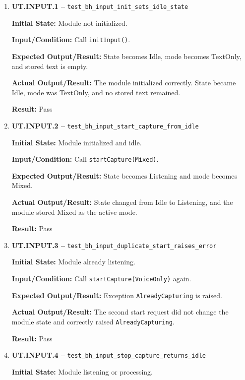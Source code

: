 \documentclass[12pt]{article}
\begin{document}
\begin{enumerate}
    \item \textbf{UT.INPUT.1 --}
    \texttt{test\_bh\_input\_init\_sets\_idle\_state}
    
    \textbf{Initial State:} Module not initialized.
    
    \textbf{Input/Condition:} Call \texttt{initInput()}.
    
    \textbf{Expected Output/Result:} State becomes Idle, mode becomes
    TextOnly, and stored text is empty.
    
    \textbf{Actual Output/Result:} The module initialized correctly.
    State became Idle, mode was TextOnly, and no stored text remained.
    
    \textbf{Result:} Pass
    
    \item \textbf{UT.INPUT.2 --}
    \texttt{test\_bh\_input\_start\_capture\_from\_idle}
    
    \textbf{Initial State:} Module initialized and idle.
    
    \textbf{Input/Condition:} Call \texttt{startCapture(Mixed)}.
    
    \textbf{Expected Output/Result:} State becomes Listening and mode
    becomes Mixed.
    
    \textbf{Actual Output/Result:} State changed from Idle to
    Listening, and the module stored Mixed as the active mode.
    
    \textbf{Result:} Pass
    
    \item \textbf{UT.INPUT.3 --}
    \texttt{test\_bh\_input\_duplicate\_start\_raises\_error}
    
    \textbf{Initial State:} Module already listening.
    
    \textbf{Input/Condition:} Call \texttt{startCapture(VoiceOnly)}
    again.
    
    \textbf{Expected Output/Result:} Exception
    \texttt{AlreadyCapturing} is raised.
    
    \textbf{Actual Output/Result:} The second start request did not
    change the module state and correctly raised
    \texttt{AlreadyCapturing}.
    
    \textbf{Result:} Pass
    
    \item \textbf{UT.INPUT.4 --}
    \texttt{test\_bh\_input\_stop\_capture\_returns\_idle}
    
    \textbf{Initial State:} Module listening or processing.
    

\end{enumerate}
\end{document}
